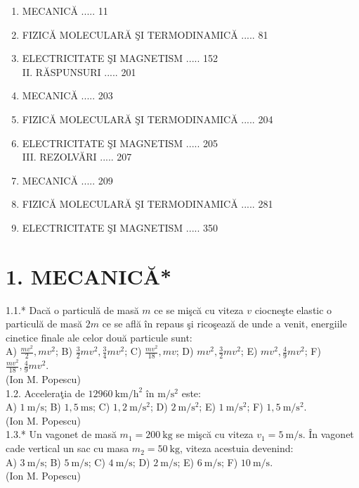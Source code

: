 \documentclass[10pt]{article}
\begin{document}
\begin{enumerate}
  \item MECANICĂ ..... 11
  \item FIZICĂ MOLECULARĂ ŞI TERMODINAMICĂ ..... 81
  \item ELECTRICITATE ŞI MAGNETISM ..... 152\\
II. RĂSPUNSURI ..... 201
  \item MECANICĂ ..... 203
  \item FIZICĂ MOLECULARĂ ŞI TERMODINAMICĂ ..... 204
  \item ELECTRICITATE ŞI MAGNETISM ..... 205\\
III. REZOLVĂRI ..... 207
  \item MECANICĂ ..... 209
  \item FIZICĂ MOLECULARĂ ŞI TERMODINAMICĂ ..... 281
  \item ELECTRICITATE ŞI MAGNETISM ..... 350
\end{enumerate}

\section*{1. MECANICĂ*}
1.1.* Dacă o particulă de masă $m$ ce se mişcă cu viteza $v$ ciocneşte elastic o particulă de masă $2 m$ ce se află în repaus şi ricoşează de unde a venit, energiile cinetice finale ale celor două particule sunt:\\ A) $\frac{m v^{2}}{2}, m v^{2}$; B) $\frac{3}{2} m v^{2}, \frac{3}{4} m v^{2}$; C) $\frac{m v^{2}}{18}, m v$; D) $m v^{2}, \frac{3}{2} m v^{2}$; E) $m v^{2}, \frac{4}{9} m v^{2}$; F) $\frac{m v^{2}}{18}, \frac{4}{9} m v^{2}$.\\ (Ion M. Popescu)\\

1.2. Acceleraţia de $12960 \mathrm{~km} / \mathrm{h}^{2}$ în $\mathrm{m} / \mathrm{s}^{2}$ este:\\ A) $1 \mathrm{~m} / \mathrm{s}$; B) $1,5 \mathrm{~ms}$; C) $1,2 \mathrm{~m} / \mathrm{s}^{2}$; D) $2 \mathrm{~m} / \mathrm{s}^{2}$; E) $1 \mathrm{~m} / \mathrm{s}^{2}$; F) $1,5 \mathrm{~m} / \mathrm{s}^{2}$.\\ (Ion M. Popescu)\\

1.3.* Un vagonet de masă $m_{1}=200 \mathrm{~kg}$ se mişcă cu viteza $v_{1}=5 \mathrm{~m} / \mathrm{s}$. În vagonet cade vertical un sac cu masa $m_{2}=50 \mathrm{~kg}$, viteza acestuia devenind:\\ A) $3 \mathrm{~m} / \mathrm{s}$; B) $5 \mathrm{~m} / \mathrm{s}$; C) $4 \mathrm{~m} / \mathrm{s}$; D) $2 \mathrm{~m} / \mathrm{s}$; E) $6 \mathrm{~m} / \mathrm{s}$; F) $10 \mathrm{~m} / \mathrm{s}$.\\ (Ion M. Popescu)\\
\end{document}
